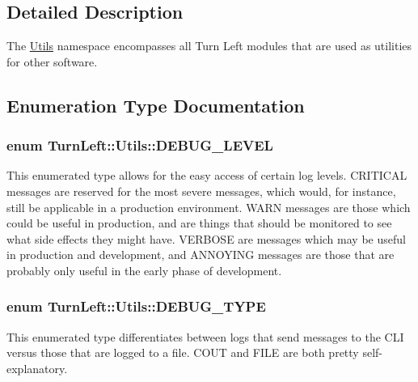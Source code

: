 \subsection{Detailed Description}
The \hyperlink{namespaceTurnLeft_1_1Utils}{Utils} namespace encompasses all Turn Left modules that are used as utilities for other software. 

\subsection{Enumeration Type Documentation}
\hypertarget{namespaceTurnLeft_1_1Utils_a55225b27548ba5d55b26a6a5f1ba294e}{
\subsubsection[{DEBUG\_\-LEVEL}]{\setlength{\rightskip}{0pt plus 5cm}enum {\bf TurnLeft::Utils::DEBUG\_\-LEVEL}}}
\label{namespaceTurnLeft_1_1Utils_a55225b27548ba5d55b26a6a5f1ba294e}
This enumerated type allows for the easy access of certain log levels. CRITICAL messages are reserved for the most severe messages, which would, for instance, still be applicable in a production environment. WARN messages are those which could be useful in production, and are things that should be monitored to see what side effects they might have. VERBOSE are messages which may be useful in production and development, and ANNOYING messages are those that are probably only useful in the early phase of development. \hypertarget{namespaceTurnLeft_1_1Utils_a9d1cba01e5417c6262d11cc154c9a252}{
\subsubsection[{DEBUG\_\-TYPE}]{\setlength{\rightskip}{0pt plus 5cm}enum {\bf TurnLeft::Utils::DEBUG\_\-TYPE}}}
\label{namespaceTurnLeft_1_1Utils_a9d1cba01e5417c6262d11cc154c9a252}
This enumerated type differentiates between logs that send messages to the CLI versus those that are logged to a file. COUT and FILE are both pretty self-\/explanatory. 